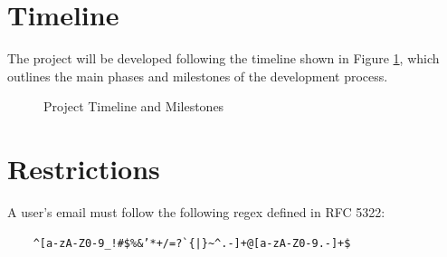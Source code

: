\documentclass[a4paper,twoside,11pt]{article}
\begin{document}
\section*{Timeline}
The project will be developed following the timeline shown in Figure \ref{fig:project-plan}, which outlines the main phases and milestones of the development process.
\begin{figure}[h]
	\begin{center}
	\end{center}
	\caption{Project Timeline and Milestones}\label{fig:project-plan}
\end{figure}



\section*{Restrictions}
A user's email must follow the following regex defined in RFC 5322\cite{rfc5322}:
\begin{verbatim}
	^[a-zA-Z0-9_!#$%&’*+/=?`{|}~^.-]+@[a-zA-Z0-9.-]+$
\end{verbatim}



\end{document}

